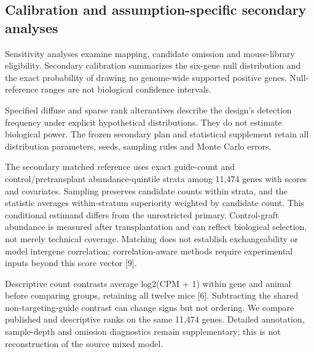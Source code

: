 \documentclass[11pt,letterpaper]{article}
\begin{document}
\subsection*{Calibration and assumption-specific secondary analyses}
Sensitivity analyses examine mapping, candidate omission and mouse-library eligibility. Secondary calibration summarizes the six-gene null distribution and the exact probability of drawing no genome-wide supported positive genes. Null-reference ranges are not biological confidence intervals.\par
Specified diffuse and sparse rank alternatives describe the design's detection frequency under explicit hypothetical distributions. They do not estimate biological power. The frozen secondary plan and statistical supplement retain all distribution parameters, seeds, sampling rules and Monte Carlo errors.\par
The secondary matched reference uses exact guide-count and control/pretransplant abundance-quintile strata among 11,474 genes with scores and covariates. Sampling preserves candidate counts within strata, and the statistic averages within-stratum superiority weighted by candidate count. This conditional estimand differs from the unrestricted primary. Control-graft abundance is measured after transplantation and can reflect biological selection, not merely technical coverage. Matching does not establish exchangeability or model intergene correlation; correlation-aware methods require experimental inputs beyond this score vector [9].\par
Descriptive count contrasts average log2(CPM + 1) within gene and animal before comparing groups, retaining all twelve mice [6]. Subtracting the shared non-targeting-guide contrast can change signs but not ordering. We compare published and descriptive ranks on the same 11,474 genes. Detailed annotation, sample-depth and omission diagnostics remain supplementary; this is not reconstruction of the source mixed model.\par
\end{document}
